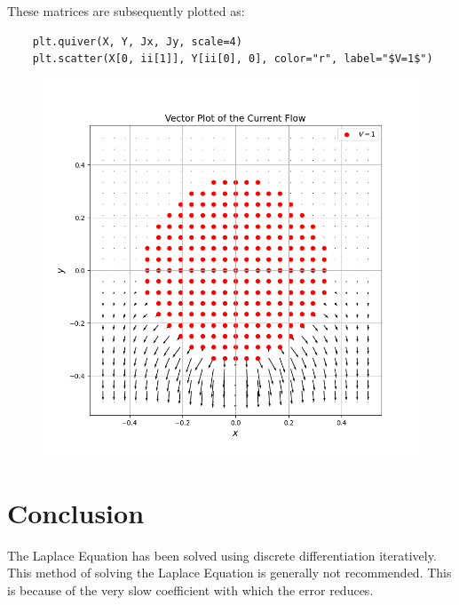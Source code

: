 \documentclass[12pt, a4paper]{article}
\begin{document}
These matrices are subsequently plotted as:
\begin{lstlisting}
    plt.quiver(X, Y, Jx, Jy, scale=4)
    plt.scatter(X[0, ii[1]], Y[ii[0], 0], color="r", label="$V=1$")
\end{lstlisting}

\begin{figure}[H]
    \centering
    \includegraphics[scale=0.5]{10.png}
\end{figure}



\section{Conclusion}
The Laplace Equation has been solved using discrete differentiation iteratively.
This method of solving the Laplace Equation is generally not recommended.
This is because of the very slow coefficient with which the error reduces.
\end{document}
